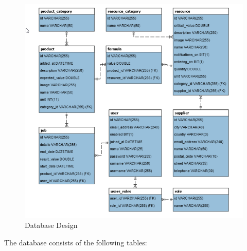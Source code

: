 \documentclass[a4paper,11pt,twoside]{report}
\theoremstyle{definition}
\begin{document}
\begin{figure}[hb!]

\begin{center}

\includegraphics{DB4}

\end{center}
\caption{Database Design}
\end{figure}

The database consists of the following tables:
\end{document}
